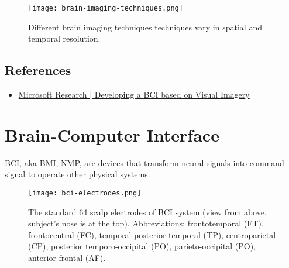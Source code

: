 \begin{figure}[hbt!]
	\centering
	\texttt{[image: brain-imaging-techniques.png]}
	\caption{Different brain imaging techniques techniques vary in spatial and temporal resolution.}
	\label{brain-imaging-techniques.png}
\end{figure}

\subsection{References}
\begin{itemize}
	\item \href{https://youtu.be/LoGBCsFPNzU}{Microsoft Research | Developing a BCI based on Visual Imagery}
\end{itemize}

\section{Brain-Computer Interface}
\ac{BCI}, \ac{aka} \ac{BMI}, \ac{NMP}, are devices that transform neural signals into command signal to operate other physical systems.

\begin{figure}[hbt!]
	\centering
	\texttt{[image: bci-electrodes.png]}
	\caption{The standard 64 scalp electrodes of \ac{BCI} system (view from above, subject's nose is at the top). Abbreviations: frontotemporal (FT), frontocentral (FC), temporal-posterior temporal (TP), centroparietal (CP), posterior temporo-occipital (PO), parieto-occipital (PO), anterior frontal (AF). \cite{sharbrough1991american}}
	\label{fig:bci-electrodes}
\end{figure}

